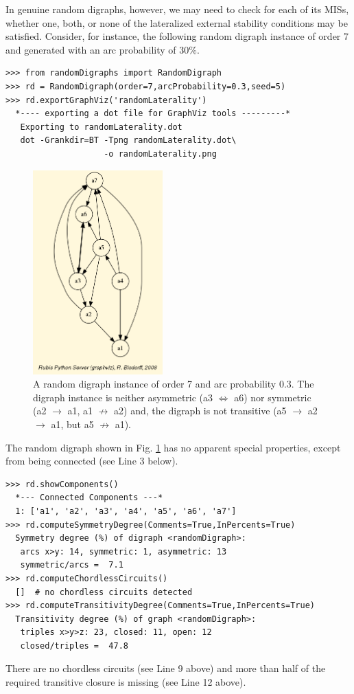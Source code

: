 In genuine random digraphs, however, we may need to check for each of its MISs, whether one, both, or none of the lateralized external stability conditions may be satisfied. Consider, for instance, the following random digraph instance of order 7 and generated with an arc probability of $30\%$. 
\begin{lstlisting}
>>> from randomDigraphs import RandomDigraph
>>> rd = RandomDigraph(order=7,arcProbability=0.3,seed=5)
>>> rd.exportGraphViz('randomLaterality')
  *---- exporting a dot file for GraphViz tools ---------*
   Exporting to randomLaterality.dot
   dot -Grankdir=BT -Tpng randomLaterality.dot\
                    -o randomLaterality.png
\end{lstlisting}
\begin{figure}[h]
\sidecaption
\includegraphics[width=5cm]{Figures/randomLaterality.png}
\caption{A random digraph instance of order 7 and arc probability 0.3. The digraph instance is neither asymmetric (a3 $\Leftrightarrow$ a6) nor symmetric (a2 $\rightarrow$ a1, a1 $\not\rightarrow$ a2) and, the digraph is not transitive (a5 $\rightarrow$ a2 $\rightarrow$ a1, but a5 $\not\rightarrow$ a1).} 
\label{fig:17.5}       %
\end{figure}
The random digraph shown in Fig. \ref{fig:17.5} has no apparent special properties, except from being connected (see Line 3 below).
\begin{lstlisting}
>>> rd.showComponents()
  *--- Connected Components ---*
  1: ['a1', 'a2', 'a3', 'a4', 'a5', 'a6', 'a7']
>>> rd.computeSymmetryDegree(Comments=True,InPercents=True)
  Symmetry degree (%) of digraph <randomDigraph>:
   arcs x>y: 14, symmetric: 1, asymmetric: 13
   symmetric/arcs =  7.1
>>> rd.computeChordlessCircuits()
  []  # no chordless circuits detected
>>> rd.computeTransitivityDegree(Comments=True,InPercents=True)
  Transitivity degree (%) of graph <randomDigraph>:
   triples x>y>z: 23, closed: 11, open: 12
   closed/triples =  47.8
\end{lstlisting}
There are no chordless circuits (see Line 9 above) and more than half of the required transitive closure is missing (see Line 12 above).

